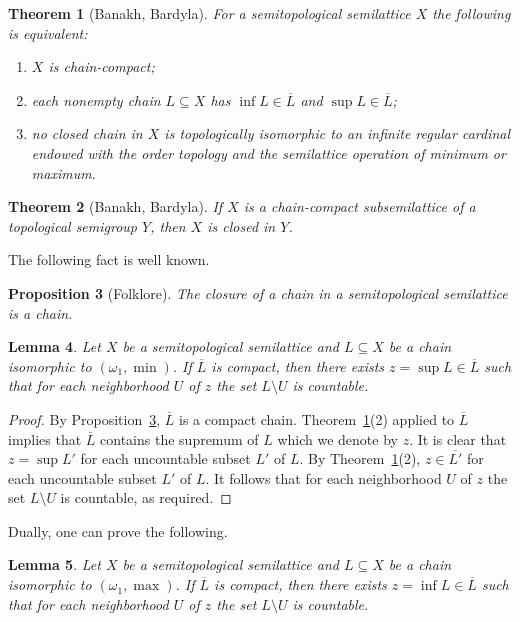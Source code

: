 \documentclass[12pt, twoside, leqno]{article}
\newtheorem{theorem}{Theorem}[section]
\newtheorem{lemma}[theorem]{Lemma}
\newtheorem{proposition}[theorem]{Proposition}
\theoremstyle{definition}
\numberwithin{equation}{section}
\newcommand{\w}{\omega}
\begin{document}
\begin{theorem}[Banakh, Bardyla]\label{BBchain}
For a semitopological semilattice $X$ the following is equivalent:
\begin{enumerate}[label=(\arabic*)] 
    \item $X$ is chain-compact;
    \item  each nonempty chain $L\subseteq X$ has $\inf L\in \overline{L}$ and $\sup L\in \overline{L}$;
    \item no closed chain in $X$ is topologically isomorphic to an infinite regular cardinal endowed with the order topology and the semilattice operation of minimum or maximum.
\end{enumerate}  
\end{theorem}

\begin{theorem}[Banakh, Bardyla]\label{H-closed}
If $X$ is a chain-compact subsemilattice of a topological semigroup $Y$, then $X$ is closed in $Y$.  
\end{theorem}

The following fact is well known.

\begin{proposition}[Folklore]\label{chainfolk}
The closure of a chain in a semitopological semilattice is a chain.    
\end{proposition}

\begin{lemma}\label{conv}
Let $X$ be a semitopological semilattice and $L\subseteq X$ be a chain isomorphic to $(\w_1,\min)$. If $\overline{L}$ is compact, then there exists $z=\sup L\in \overline{L}$ such that for each neighborhood $U$ of $z$ the set $L\setminus U$ is countable.   
\end{lemma}

\begin{proof}
By Proposition~\ref{chainfolk}, $\overline{L}$ is a compact chain. Theorem~\ref{BBchain}(2) applied to $\overline{L}$ implies that $\overline{L}$ contains the supremum of $L$ which we denote by $z$. It is clear that $z=\sup L'$ for each uncountable subset $L'$ of $L$. By Theorem~\ref{BBchain}(2), $z\in\overline{L'}$ for each uncountable subset $L'$ of $L$.  It follows that for each neighborhood $U$ of $z$ the set $L\setminus U$ is countable, as required.
\end{proof}


Dually, one can prove the following.

\begin{lemma}\label{conv1}
Let $X$ be a semitopological semilattice and $L\subseteq X$ be a chain isomorphic to $(\w_1,\max)$. If $\overline{L}$ is compact, then there exists $z=\inf L\in \overline{L}$ such that for each neighborhood $U$ of $z$ the set $L\setminus U$ is countable.   
\end{lemma}
\end{document}
